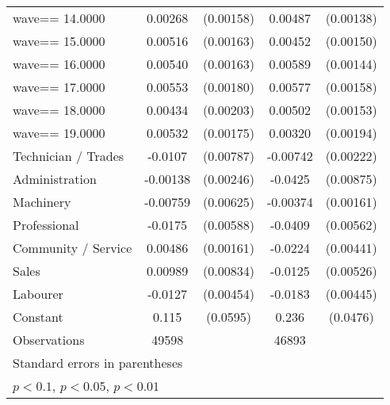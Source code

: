 {\begin{tabular}{l*{2}{cc}}
wave==    14.0000   &     0.00268\sym{*}  &   (0.00158)&     0.00487\sym{***}&   (0.00138)\\
wave==    15.0000   &     0.00516\sym{***}&   (0.00163)&     0.00452\sym{***}&   (0.00150)\\
wave==    16.0000   &     0.00540\sym{***}&   (0.00163)&     0.00589\sym{***}&   (0.00144)\\
wave==    17.0000   &     0.00553\sym{***}&   (0.00180)&     0.00577\sym{***}&   (0.00158)\\
wave==    18.0000   &     0.00434\sym{**} &   (0.00203)&     0.00502\sym{***}&   (0.00153)\\
wave==    19.0000   &     0.00532\sym{***}&   (0.00175)&     0.00320\sym{*}  &   (0.00194)\\
Technician / Trades &     -0.0107         &   (0.00787)&    -0.00742\sym{***}&   (0.00222)\\
Administration      &    -0.00138         &   (0.00246)&     -0.0425\sym{***}&   (0.00875)\\
Machinery           &    -0.00759         &   (0.00625)&    -0.00374\sym{**} &   (0.00161)\\
Professional        &     -0.0175\sym{***}&   (0.00588)&     -0.0409\sym{***}&   (0.00562)\\
Community / Service &     0.00486\sym{***}&   (0.00161)&     -0.0224\sym{***}&   (0.00441)\\
Sales               &     0.00989         &   (0.00834)&     -0.0125\sym{**} &   (0.00526)\\
Labourer            &     -0.0127\sym{***}&   (0.00454)&     -0.0183\sym{***}&   (0.00445)\\
Constant            &       0.115\sym{*}  &    (0.0595)&       0.236\sym{***}&    (0.0476)\\
\hline
Observations        &       49598         &            &       46893         &            \\
\hline\hline
\multicolumn{5}{l}{\footnotesize Standard errors in parentheses}\\
\multicolumn{5}{l}{\footnotesize \sym{*} \(p<0.1\), \sym{**} \(p<0.05\), \sym{***} \(p<0.01\)}\\
\end{tabular}
}

